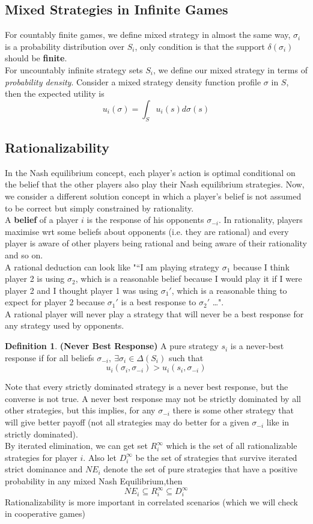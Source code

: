 \documentclass{article}
\theoremstyle{definition}
\newtheorem{defn}{Definition}[section]
\begin{document}
\subsection{Mixed Strategies in Infinite Games}
For countably finite games, we define mixed strategy in almost the same way, $\sigma_i$ is a probability distribution over $S_i$, only condition is that the support $\delta(\sigma_i)$ should be \textbf{finite}.\\

For uncountably infinite strategy sets $S_i$, we define our mixed strategy in terms of \textit{probability density}. Consider a mixed strategy density function profile $\sigma$ in $S$, then the expected utility is $$u_i(\sigma) = \int_S u_i(s)d\sigma(s)$$
\subsection{Rationalizability}
In the Nash equilibrium concept, each player’s action is optimal conditional on the belief that the other players also play their Nash equilibrium strategies. Now, we consider a different solution concept in which a player's belief is not assumed to be correct but simply constrained by rationality.\\
A \textbf{belief} of a player $i$ is the response of his opponents $\sigma_{-i}$. In rationality, players maximise wrt some beliefs about opponents (i.e. they are rational) and every player is aware of other players being rational and being aware of their rationality and so on.\\

A rational deduction can look like "“I am playing strategy $\sigma_1$ because I think player 2 is using $\sigma_2$, which is a reasonable belief because I would play it if I were player 2 and I thought player 1 was using $\sigma_1'$, which is a reasonable thing to expect for player 2 because $\sigma_1'$ is a best response to $\sigma_2'$ \dots".\\
A rational player will never play a strategy that will never be a best response for any strategy used by opponents. 
\begin{defn}
\textbf{(Never Best Response)} A pure strategy $s_i$ is a never-best response if for all beliefs $\sigma_{-i},~\exists \sigma_i\in \Delta(S_i)$ such that $$u_i(\sigma_i,\sigma_{-i})>u_i(s_i,\sigma_{-i})$$
\end{defn}
Note that every strictly dominated strategy is a never best response, but the converse is not true. A never best response may not be strictly dominated by all other strategies, but this implies, for any $\sigma_{-i}$ there is some other strategy that will give better payoff (not all strategies may do better for a given $\sigma_{-i}$ like in strictly dominated).\\
By iterated elimination, we can get set $R_i^{\infty}$ which is the set of all rationalizable strategies for player $i$. Also let $D_i^\infty$ be the set of strategies that survive iterated strict dominance and $NE_i$ denote the set of pure strategies that have a positive probability in any mixed Nash Equilibrium,then $$NE_i\subseteq R_i^\infty \subseteq D_i^\infty$$
Rationalizability is more important in correlated scenarios (which we will check in cooperative games)
\end{document}
